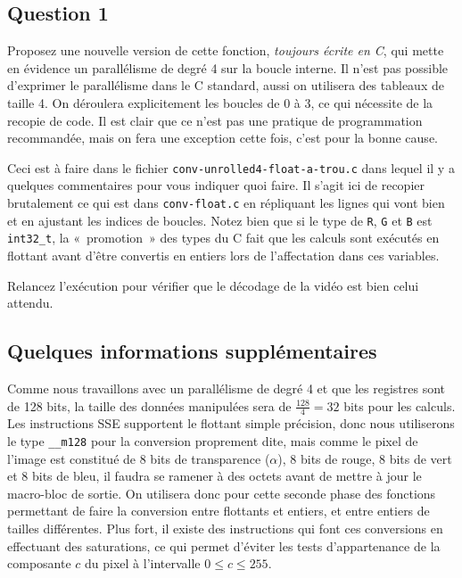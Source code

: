 \documentclass[a4paper,12pt]{article}
\begin{document}
\subsection*{Question 1}
Proposez une nouvelle version de cette fonction, \emph{toujours écrite en C}, qui mette en évidence un parallélisme de degré 4 sur la boucle interne.
Il n'est pas possible d'exprimer le parallélisme dans le C standard, aussi on utilisera des tableaux de taille 4.
On déroulera explicitement les boucles de 0 à 3, ce qui nécessite de la recopie de code.
Il est clair que ce n'est pas une pratique de programmation recommandée, mais on fera une exception cette fois, c'est pour la bonne cause.

Ceci est à faire dans le fichier \lstinline[language=bash]{conv-unrolled4-float-a-trou.c} dans lequel il y a quelques commentaires pour vous indiquer quoi faire.
Il s'agit ici de recopier brutalement ce qui est dans \lstinline[language=bash]{conv-float.c} en répliquant les lignes qui vont bien et en ajustant les indices de boucles.
Notez bien que si le type de \lstinline{R}, \lstinline{G} et \lstinline{B} est \lstinline{int32_t}, la «~promotion~» des types du C fait que les calculs sont exécutés en flottant avant d'être convertis en entiers lors de l'affectation dans ces variables.

Relancez l'exécution pour vérifier que le décodage de la vidéo est bien celui attendu.

\subsection*{Quelques informations supplémentaires}
Comme nous travaillons avec un parallélisme de degré 4 et que les registres sont de 128 bits, la taille des données manipulées sera de $\frac{128}{4} = 32$ bits pour les calculs.
Les instructions SSE supportent le flottant simple précision, donc nous utiliserons le type \lstinline{__m128} pour la conversion proprement dite, mais comme le pixel de l'image est constitué de 8 bits de transparence ($\alpha$), 8 bits de rouge, 8 bits de vert et 8 bits de bleu, il faudra se ramener à des octets avant de mettre à jour le macro-bloc de sortie.
On utilisera donc pour cette seconde phase des fonctions permettant de faire la conversion entre flottants et entiers, et entre entiers de tailles différentes.
Plus fort, il existe des instructions qui font ces conversions en effectuant des saturations, ce qui permet d'éviter les tests d'appartenance de la composante $c$ du pixel à l'intervalle $0 \leq c \leq 255$.
\end{document}
